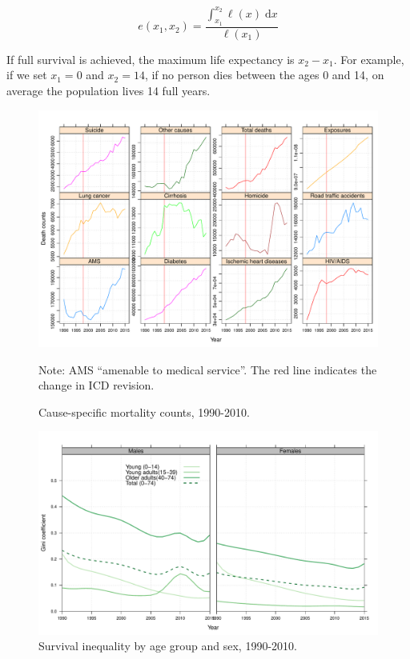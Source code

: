 \documentclass[11.5pt]{article}
\newcommand{\dd}{\; \mathrm{d}}
\begin{document}
{\begin{equation}
e(x_1,x_2) = \frac{\int _{x_1}^{x_2} \ell(x) \dd x}{\ell(x_1)}
\end{equation}

If full survival is achieved, the maximum life expectancy is $x_2-x_1$.  For example, if we set $x_1=0$ and $x_2=14$, if no person dies between the ages 0 and 14, on average the population lives 14 full years.



\begin{figure}
\centering
\caption{Cause-specific mortality counts, 1990-2010.}
\label{fig:ClassSens}
\includegraphics[scale=.6]{Sensitivity_fig.pdf}

Note: AMS ``amenable to medical service''. The red line indicates the change in ICD revision. 
\end{figure}

\begin{figure}[h!]
\centering
\caption{Survival inequality by age group and sex, 1990-2010.}
\label{fig:Gini}
\includegraphics[scale=.5]{Gini_fig.pdf}
\end{figure}


}
\end{document}
